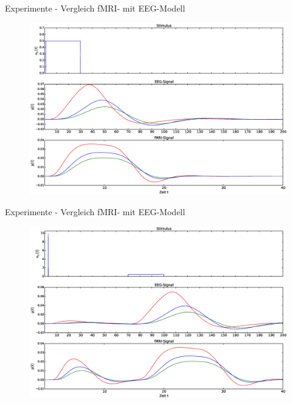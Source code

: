 \documentclass{beamer}
\begin{document}
\begin{frame}{Experimente - Vergleich fMRI- mit EEG-Modell}
\begin{figure}
\centering
\includegraphics[scale=0.25]{res/hemo-EEG-vergleich2.eps}
\end{figure}
\end{frame}

\begin{frame}{Experimente - Vergleich fMRI- mit EEG-Modell}
\begin{figure}
\centering
\includegraphics[scale=0.25]{res/hemo-EEG-vergleich3.eps}
\end{figure}
\end{frame}
\end{document}
